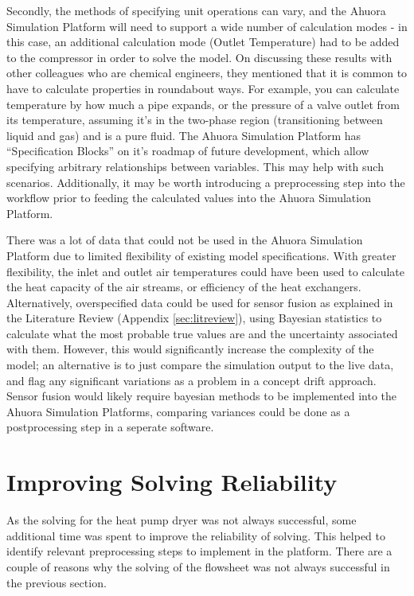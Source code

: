 Secondly, the methods of specifying unit operations can vary, and the Ahuora Simulation Platform will need to support a wide number of calculation modes - in this case, an additional calculation mode (Outlet Temperature) had to be added to the compressor in order to solve the model. On discussing these results with other colleagues who are chemical engineers, they mentioned that it is common to have to calculate properties in roundabout ways. 
For example, you can calculate temperature by how much a pipe expands, or the pressure of a valve outlet from its temperature, assuming it's in the two-phase region (transitioning between liquid and gas) and is a pure fluid. The Ahuora Simulation Platform has ``Specification Blocks'' on it's roadmap of future development, which allow specifying arbitrary relationships between variables. This may help with such scenarios. Additionally, it may be worth introducing a preprocessing step into the workflow prior to feeding the calculated values into the Ahuora Simulation Platform.

There was a lot of data that could not be used in the Ahuora Simulation Platform due to limited flexibility of existing model specifications. With greater flexibility, the inlet and outlet air temperatures could have been used to calculate the heat capacity of the air streams, or efficiency of the heat exchangers.
Alternatively, overspecified data could be used for sensor fusion as explained in the Literature Review (Appendix \ref{sec:litreview}), using Bayesian statistics to calculate what the most probable true values are and the uncertainty associated with them. 
However, this would significantly increase the complexity of the model; an alternative is to just compare the simulation output to the live data, and flag any significant variations as a problem in a concept drift approach. 
Sensor fusion would likely require bayesian methods to be implemented into the Ahuora Simulation Platforms, comparing variances could be done as a postprocessing step in a seperate software.








\section{Improving Solving Reliability} \label{sec:solvingreliability}

As the solving for the heat pump dryer was not always successful, some additional time was spent to improve the reliability of solving.
This helped to identify relevant preprocessing steps to implement in the platform.
There are a couple of reasons why the solving of the flowsheet was not always successful in the previous section. 

